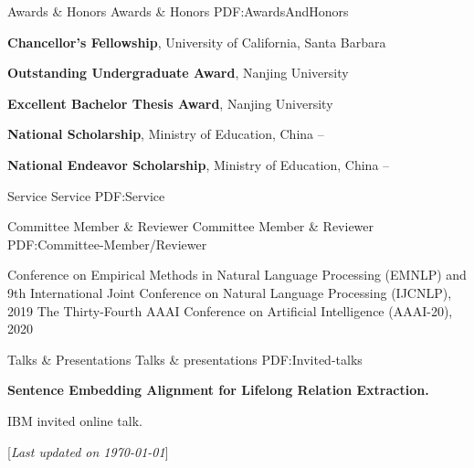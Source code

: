 \documentclass[letterpaper,MMMyyyy,nonstopmode]{simpleresumecv}
\newcommand{\CVNote}{Last updated on {\today}}
\begin{document}
\begin{Body}
\begin{enumerate}[label={[\arabic*]~~}]
\end{enumerate}



\Section
{Awards \&\newline
Honors}
{Awards \& Honors}
{PDF:AwardsAndHonors}

\Entry
\textbf{Chancellor's Fellowship}, University of California, Santa Barbara
\hfill
{}

\Gap
\Entry
\textbf{Outstanding Undergraduate Award}, Nanjing University
\hfill
{}

\Gap
\Entry
\textbf{Excellent Bachelor Thesis Award}, Nanjing University
\hfill
{}

\Gap
\Entry
\textbf{National Scholarship}, Ministry of Education, China
\hfill
{} -- 

\Gap
\Entry
\textbf{National Endeavor Scholarship}, Ministry of Education, China
\hfill
{} -- 

\Section
{Service}
{Service}
{PDF:Service}

\SubSection
{Committee Member \& Reviewer}
{Committee Member \& Reviewer}
{PDF:Committee-Member/Reviewer}

    \BulletItem Conference on Empirical Methods in Natural Language Processing (EMNLP) and 9th International Joint Conference on Natural Language Processing (IJCNLP), 2019
    \BulletItem The Thirty-Fourth AAAI Conference on Artificial Intelligence (AAAI-20), 2020

\Section
{Talks \& \newline Presentations}
{Talks \& presentations}
{PDF:Invited-talks}

\Entry \textbf{Sentence Embedding Alignment for Lifelong Relation Extraction.} \hfill {}
\begin{Detail}
\BulletItem
IBM invited online talk.
\end{Detail}


\end{Body}


\UseNoteFont%
\null\hfill%
[\textit{\CVNote}]
\end{document}
